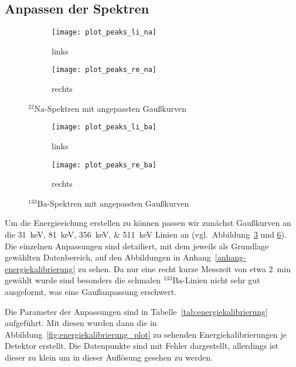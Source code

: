 \documentclass[11pt, ngerman, fleqn, DIV=15, headinclude, BCOR=2cm]{scrreprt}
\begin{document}
\subsection{Anpassen der Spektren}
\begin{figure}[h]
	\centering
	\begin{subfigure}{0.49 \textwidth}
		\texttt{[image: plot\_peaks\_li\_na]}
		\caption{%
			links
		}
		\label{fig:na_peaks-li_plot}
	\end{subfigure}
	\begin{subfigure}{0.49 \textwidth}
		\texttt{[image: plot\_peaks\_re\_na]}
		\caption{%
			rechts
		}
		\label{fig:na_peaks-re_plot}
	\end{subfigure}
	\caption{%
		$^{22}\text{Na}$-Spektren mit angepassten Gaußkurven
	}
	\label{fig:na_peaks_plot}
\end{figure}
\begin{figure}[h]
	\centering
	\begin{subfigure}{0.49 \textwidth}
		\texttt{[image: plot\_peaks\_li\_ba]}
		\caption{%
			links
		}
		\label{fig:ba_peaks-li_plot}
	\end{subfigure}
	\begin{subfigure}{0.49 \textwidth}
		\texttt{[image: plot\_peaks\_re\_ba]}
		\caption{%
			rechts
		}
		\label{fig:ba_peaks-re_plot}
	\end{subfigure}
	\caption{%
		$^{133}\text{Ba}$-Spektren mit angepassten Gaußkurven
	}
	\label{fig:ba_peaks_plot}
\end{figure}

Um die Energieeichung erstellen zu können passen wir zunächst Gaußkurven an die
\SIlist{31;81;356;511}{\kilo\electronvolt} Linien an (vgl.\
Abbildung~\ref{fig:na_peaks_plot} und \ref{fig:ba_peaks_plot}).
Die einzelnen Anpassungen sind detailiert, mit dem jeweils als Grundlage
gewählten Datenbereich, auf den Abbildungen in
Anhang~\ref{anhang-energiekalibrierung} zu sehen.
Da nur eine recht kurze Messzeit von etwa \SI{2}{\minute} gewählt wurde sind
besonders die schmalen $^{133}\text{Ba}$-Linien nicht sehr gut ausgeformt, was
eine Gaußanpassung erschwert.

Die Parameter der Anpassungen sind in Tabelle~\ref{tab:energiekalibrierung}
aufgeführt. Mit diesen wurden dann die in
Abbildung~\ref{fig:energiekalibrierung_plot} zu sehenden Energiekalibrierungen
je Detektor erstellt. Die Datenpunkte sind mit Fehler dargestellt, allerdings
ist dieser zu klein um in dieser Auflösung gesehen zu werden.
\end{document}
